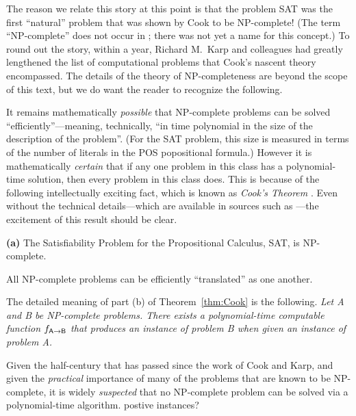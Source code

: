 The reason we relate this story at this point is that the problem {\sf
  SAT} was the first ``natural'' problem that was shown by Cook to be
{\sf NP}-complete!  (The term ``{\sf NP}-complete'' does not occur in
\cite{Cook71}; there was not yet a name for this concept.)  To round
out the story, within a year, Richard M.~Karp 
and colleagues had greatly lengthened the list of computational
problems that Cook's nascent theory encompassed.  The details of the
theory of {\sf NP}-completeness are beyond the scope of this text, but
we do want the reader to recognize the following.

It remains mathematically {\em possible} that {\sf NP}-complete
problems can be solved ``efficiently''---meaning, technically, ``in
time polynomial in the size of the description of the problem''.  (For
the {\sf SAT} problem, this size is measured in terms of the number of
literals in the POS popositional formula.)  However it is
mathematically {\em certain} that if any one problem in this class has
a polynomial-time solution, then every problem in this class does.
This is because of the following intellectually exciting fact, which
is known as {\it Cook's Theorem} .  Even without
the technical details---which are available in sources such as
\cite{GareyJ79,Rosenberg09}---the excitement of this result should be
clear.

\begin{theorem}
\label{thm:Cook}
{\bf (a)}
The Satisfiability Problem for the Propositional Calculus, {\sf SAT},
is {\sf NP}-complete.

All {\sf NP}-complete problems can be efficiently ``translated'' as
one another.
\end{theorem}

The detailed meaning of part (b) of Theorem~\ref{thm:Cook} is the
following.  {\em Let {\sf A} and {\sf B} be {\sf NP}-complete
  problems.  There exists a polynomial-time computable function
  $f_{{\sf A} \rightarrow {\sf B}}$ that produces an instance of
  problem {\sf B} when given an instance of problem {\sf A}.}

\medskip

Given the half-century that has passed since the work of Cook and
Karp, and given the {\em practical} importance of many of the problems
that are known to be {\sf NP}-complete, it is widely {\em suspected}
that no {\sf NP}-complete problem can be solved via a polynomial-time
algorithm.
{\Denis postive instances?}

